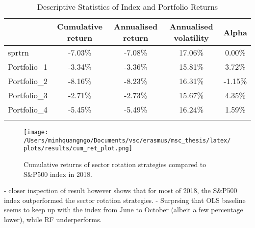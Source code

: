 \begin{table}[ht]
    \centering
    \caption{Descriptive Statistics of Index and Portfolio Returns}
    \label{tab:return_stats_1}
    \begin{tabular}{lcccc}
        \toprule
        {} & Cumulative return & Annualised return & Annualised volatility & Alpha \\
        \midrule
        sprtrn & -7.03\% & -7.08\% & 17.06\% & 0.00\% \\
        Portfolio\_1 & -3.34\% & -3.36\% & 15.81\% & 3.72\% \\
        Portfolio\_2 & -8.16\% & -8.23\% & 16.31\% & -1.15\% \\
        Portfolio\_3 & -2.71\% & -2.73\% & 15.67\% & 4.35\% \\
        Portfolio\_4 & -5.45\% & -5.49\% & 16.24\% & 1.59\% \\
        \\
        \bottomrule
    \end{tabular}
\end{table}

\begin{figure}[H]
    \centering
    \texttt{[image: /Users/minhquangngo/Documents/vsc/erasmus/msc\_thesis/latex/plots/results/cum\_ret\_plot.png]}
    \caption{Cumulative returns of sector rotation strategies compared to S\&P500 index in 2018.}
    \label{fig:cum_ret_plot}
\end{figure}

- closer inspection of result however shows that for most of 2018, the S\&P500 index outperformed the sector rotation strategies.
- Surprsing that OLS baseline seems to keep up with the index from June to October (albeit a few percentage lower), while RF underperforms.